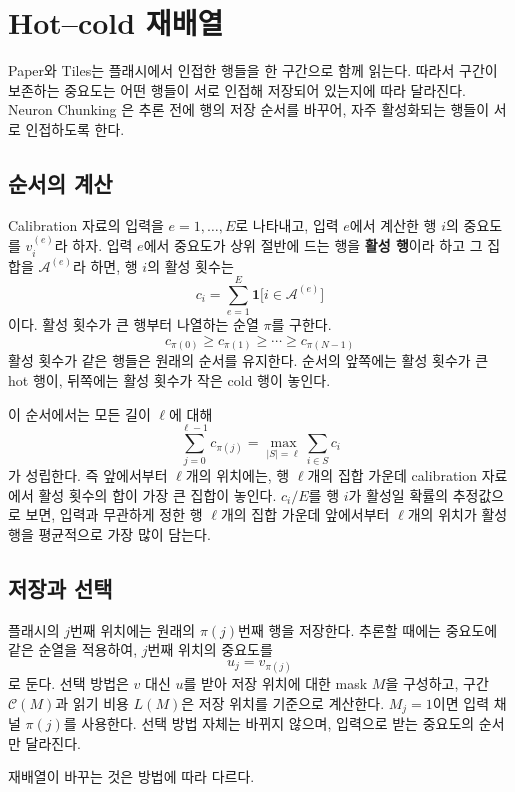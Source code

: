 \section{Hot--cold 재배열}\label{sec:hot-cold}

Paper와 Tiles는 플래시에서 인접한 행들을 한 구간으로 함께 읽는다. 따라서 구간이 보존하는 중요도는 어떤 행들이 서로 인접해 저장되어 있는지에 따라 달라진다. Neuron Chunking \cite{yang2025}은 추론 전에 행의 저장 순서를 바꾸어, 자주 활성화되는 행들이 서로 인접하도록 한다.

\subsection{순서의 계산}\label{sec:hot-cold-order}

Calibration 자료의 입력을 $e=1,\ldots,E$로 나타내고, 입력 $e$에서 계산한 행 $i$의 중요도를 $v_i^{(e)}$라 하자. 입력 $e$에서 중요도가 상위 절반에 드는 행을 \textbf{활성 행}이라 하고 그 집합을 $\mathcal A^{(e)}$라 하면, 행 $i$의 활성 횟수는
\[
c_i=\sum_{e=1}^{E}\mathbf 1\bigl[i\in\mathcal A^{(e)}\bigr]
\]
이다. 활성 횟수가 큰 행부터 나열하는 순열 $\pi$를 구한다.
\[
\boxed{c_{\pi(0)}\ge c_{\pi(1)}\ge\cdots\ge c_{\pi(N-1)}}
\]
활성 횟수가 같은 행들은 원래의 순서를 유지한다. 순서의 앞쪽에는 활성 횟수가 큰 hot 행이, 뒤쪽에는 활성 횟수가 작은 cold 행이 놓인다.

이 순서에서는 모든 길이 $\ell$에 대해
\[
\sum_{j=0}^{\ell-1}c_{\pi(j)}=\max_{|S|=\ell}\sum_{i\in S}c_i
\]
가 성립한다. 즉 앞에서부터 $\ell$개의 위치에는, 행 $\ell$개의 집합 가운데 calibration 자료에서 활성 횟수의 합이 가장 큰 집합이 놓인다. $c_i/E$를 행 $i$가 활성일 확률의 추정값으로 보면, 입력과 무관하게 정한 행 $\ell$개의 집합 가운데 앞에서부터 $\ell$개의 위치가 활성 행을 평균적으로 가장 많이 담는다.

\subsection{저장과 선택}\label{sec:hot-cold-use}

플래시의 $j$번째 위치에는 원래의 $\pi(j)$번째 행을 저장한다. 추론할 때에는 중요도에 같은 순열을 적용하여, $j$번째 위치의 중요도를
\[
u_j=v_{\pi(j)}
\]
로 둔다. 선택 방법은 $v$ 대신 $u$를 받아 저장 위치에 대한 mask $M$을 구성하고, 구간 $\mathcal C(M)$과 읽기 비용 $L(M)$은 저장 위치를 기준으로 계산한다. $M_j=1$이면 입력 채널 $\pi(j)$를 사용한다. 선택 방법 자체는 바뀌지 않으며, 입력으로 받는 중요도의 순서만 달라진다.

재배열이 바꾸는 것은 방법에 따라 다르다.

